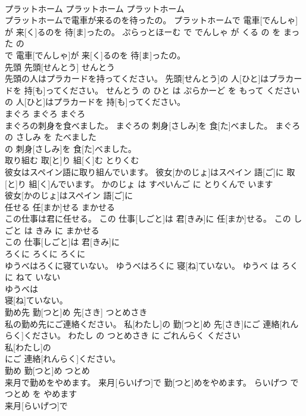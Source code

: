 \documentclass[8pt]{extreport}
\begin{document}
\begin{CJK}{UTF8}{min}
\\	プラットホーム	プラットホーム	プラットホーム	
\\	プラットホームで電車が来るのを待ったの。	プラットホームで 電車[でんしゃ]が 来[く]るのを 待[ま]ったの。	ぷらっとほーむ で でんしゃ が くる の を まった の	
\\	で 電車[でんしゃ]が 来[く]るのを 待[ま]ったの。			
\\	先頭	先頭[せんとう]	せんとう	
\\	先頭の人はプラカードを持ってください。	先頭[せんとう]の 人[ひと]はプラカードを 持[も]ってください。	せんとう の ひと は ぷらかーど を もって ください	
\\	の 人[ひと]はプラカードを 持[も]ってください。			
\\	まぐろ	まぐろ	まぐろ	
\\	まぐろの刺身を食べました。	まぐろの 刺身[さしみ]を 食[た]べました。	まぐろ の さしみ を たべました	
\\	の 刺身[さしみ]を 食[た]べました。			
\\	取り組む	取[と]り 組[く]む	とりくむ	
\\	彼女はスペイン語に取り組んでいます。	彼女[かのじょ]はスペイン 語[ご]に 取[と]り 組[く]んでいます。	かのじょ は すぺいんご に とりくんで います	
\\	彼女[かのじょ]はスペイン 語[ご]に
\\	任せる	任[まか]せる	まかせる	
\\	この仕事は君に任せる。	この 仕事[しごと]は 君[きみ]に 任[まか]せる。	この しごと は きみ に まかせる	
\\	この 仕事[しごと]は 君[きみ]に
\\	ろくに	ろくに	ろくに	
\\	ゆうべはろくに寝ていない。	ゆうべはろくに 寝[ね]ていない。	ゆうべ は ろくに ねて いない	
\\	ゆうべは
\\	寝[ね]ていない。			
\\	勤め先	勤[つと]め 先[さき]	つとめさき	
\\	私の勤め先にご連絡ください。	私[わたし]の 勤[つと]め 先[さき]にご 連絡[れんらく]ください。	わたし の つとめさき に ごれんらく ください	
\\	私[わたし]の
\\	にご 連絡[れんらく]ください。			
\\	勤め	勤[つと]め	つとめ	
\\	来月で勤めをやめます。	来月[らいげつ]で 勤[つと]めをやめます。	らいげつ で つとめ を やめます	
\\	来月[らいげつ]で

\end{CJK}
\end{document}
